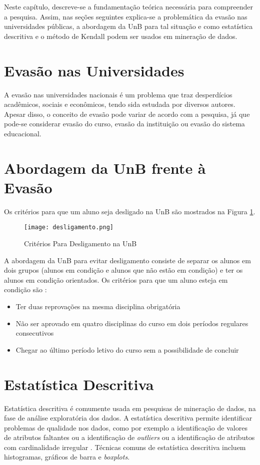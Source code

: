Neste capítulo, descreve-se a fundamentação teórica necessária para compreender a
pesquisa. Assim, nas seções seguintes explica-se a problemática da evasão nas universidades
públicas, a abordagem da UnB para tal situação e como estatística descritiva e o
método de Kendall podem ser usados em mineração de dados. 

\section{Evasão nas Universidades} 
A evasão nas universidades nacionais é um problema que traz desperdícios acadêmicos,
sociais e econômicos, tendo sida estudada por diversos autores. Apesar disso, o
conceito de evasão pode variar \cite{mec_conceito_evasao} de acordo com a pesquisa,
já que pode-se considerar evasão do curso, evasão da instituição ou evasão do
sistema educacional. 

\section{Abordagem da UnB frente à Evasão}
\par Os critérios para que um aluno seja desligado na UnB são mostrados na Figura
\ref{desligamento}. 
\begin{figure}[!ht]
    \caption{Critérios Para Desligamento na UnB}
    \centering
    \texttt{[image: desligamento.png]}
    \label{desligamento}
\end{figure}
 
A abordagem da UnB para evitar desligamento consiste de separar os alunos em dois
grupos (alunos em condição e alunos que não estão em condição) e ter os alunos em
condição orientados. Os critérios para que um aluno esteja em condição são
\cite{manual_calouro}: 
\begin{itemize}
    \item Ter duas reprovações na mesma disciplina obrigatória
    \item Não ser aprovado em quatro disciplinas do curso em dois períodos regulares
        consecutivos
    \item Chegar ao último período letivo do curso sem a possibilidade de concluir
\end{itemize}

\section{Estatística Descritiva} 
Estatística descritiva é comumente usada em pesquisas de mineração de
dados, na fase de análise exploratória dos dados. A estatística descritiva permite
identificar problemas de qualidade nos dados, como por exemplo a identificação de
valores de atributos faltantes ou a identificação de \textit{outliers} ou a identificação de
atributos com cardinalidade irregular \cite{ml_book}. Técnicas comuns de estatística
descritiva incluem histogramas, gráficos de barra e \textit{boxplots}. 

